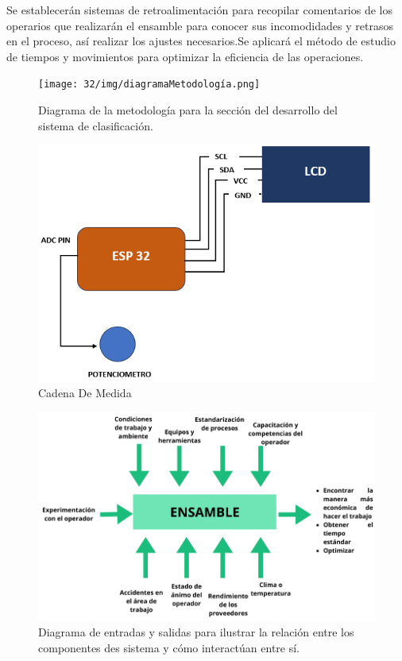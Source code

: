 \begin{itemize}
    
    Se establecerán sistemas de retroalimentación para recopilar comentarios de los operarios que realizarán el ensamble para conocer sus incomodidades y retrasos en el proceso, así realizar los ajustes necesarios.Se aplicará el método de estudio de tiempos y movimientos para optimizar la eficiencia de las operaciones.
    \begin{figure}[H]
        \centering
        \texttt{[image: 32/img/diagramaMetodología.png]}
        \caption{Diagrama de la metodología para la sección del desarrollo del sistema de clasificación.}
        \label{fig:enter-label}
    \end{figure}
    \begin{figure}[H]
        \centering
        \includegraphics[scale=0.5]{32/img/cadenaDeMedida.png}
        \caption{Cadena De Medida}
        \label{fig:enter-label}
    \end{figure}
    \begin{figure}[H]
        \centering
        \includegraphics[scale=0.4]{32/img/diagramEntradasySalidas.png}
        \caption{Diagrama de entradas y salidas para ilustrar la relación entre los componentes des sistema y cómo interactúan entre sí.}
        \label{fig:enter-label}
    \end{figure}
    

\end{itemize}
